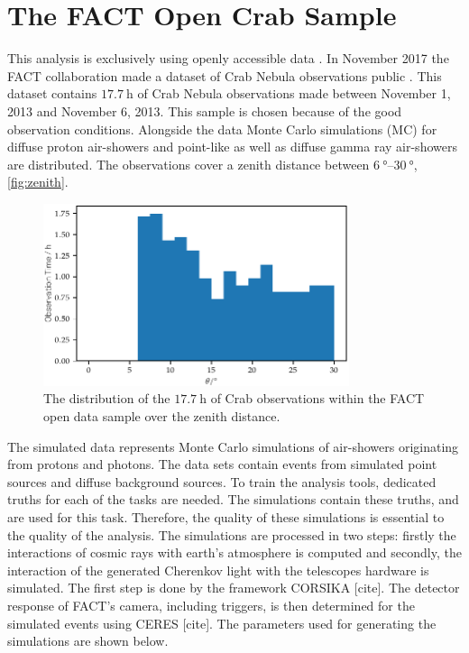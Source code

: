 \chapter{The FACT Open Crab Sample}
%
This analysis is exclusively using openly accessible data \cite{fact-data}. In November 2017 the
FACT collaboration made a dataset of Crab Nebula observations public
\cite{FACT-Design, FACT-Calib}. This dataset contains $\SI{17.7}{\hour}$
of Crab Nebula observations made between November 1, 2013 and November 6, 2013.
This sample is chosen because of the good observation conditions. Alongside the
data Monte Carlo simulations (MC) for diffuse proton air-showers and point-like
as well as diffuse gamma ray air-showers are distributed. The observations
cover a zenith distance between $\SIrange{6}{30}{\degree}$, \autoref{fig:zenith}.
%
\begin{figure}
  \centering%
  \includegraphics[width=0.8\textwidth]{Plots/zenith.pdf}%
  \caption{The distribution of the $\SI{17.7}{\hour}$ of Crab observations within the FACT open data sample over the zenith distance.}%
  \label{fig:zenith}%
\end{figure}
%
The simulated data represents Monte Carlo simulations of air-showers
originating from protons and photons. The data sets contain events from
simulated point sources and diffuse background sources. To train the analysis
tools, dedicated truths for each of the tasks are needed. The simulations
contain these truths, and are used for this task. Therefore, the quality of
these simulations is essential to the quality of the analysis. The simulations
are processed in two steps: firstly the interactions of cosmic rays with earth's
atmosphere is computed and secondly, the interaction of the generated Cherenkov
light with the telescopes hardware is simulated. The first step is done by the
framework CORSIKA [cite]. The detector response of FACT's camera, including
triggers, is then determined for the simulated events using CERES [cite]. The
parameters used for generating the simulations are shown below.

